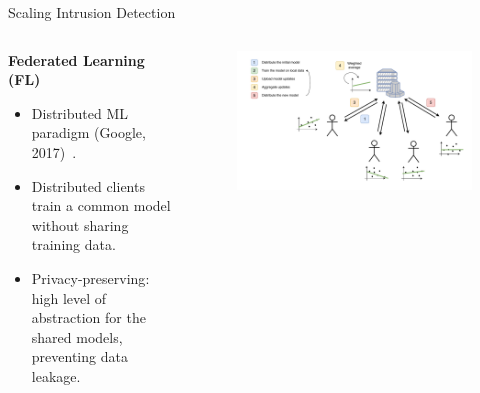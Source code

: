 \begin{frame}{Scaling Intrusion Detection}

  \begin{columns}
    \begin{column}{0.4\textwidth}
      \textbf{Federated Learning (FL)}
      \small
      \begin{itemize}[<+->]
        \item Distributed ML paradigm (Google, 2017)~\autocite{mcmahan_Communicationefficientlearningdeep_2017}.
        \item Distributed clients  train a common model without sharing training data.
        \item \alert{Privacy-preserving}: high level of abstraction for the shared models, preventing data leakage.
      \end{itemize}
    \end{column}
    
    \begin{column}{0.6\textwidth}
      \begin{figure}
        \centering
        \includegraphics[width=1.1\linewidth,right]{figures/intro/fl.drawio.pdf}
      \end{figure}
    \end{column}
  \end{columns}

\end{frame}

